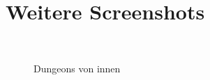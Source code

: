 \chapter{Weitere Screenshots}

\begin{figure}[htbp]
  \centering  
  \\    
	\caption[Screenshot Dungeon 1]{Dungeons von innen}
	 \label{B_VerwackelnGlaettenShots}
\end{figure}


